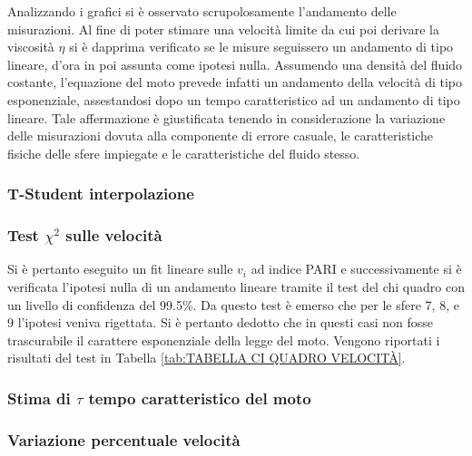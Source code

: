 \documentclass[a4paper,11pt,oneside]{article}
\begin{document}
Analizzando i grafici si è osservato scrupolosamente l'andamento delle misurazioni. Al fine di poter stimare una velocità limite da cui poi derivare la viscosità $\eta$ si è dapprima verificato se le misure seguissero un andamento di tipo lineare, d'ora in poi assunta come ipotesi nulla.
Assumendo una densità del fluido costante, l'equazione del moto prevede infatti un andamento della velocità di tipo esponenziale, assestandosi dopo un tempo caratteristico ad un andamento di tipo lineare. Tale affermazione è giustificata tenendo in considerazione la variazione delle misurazioni dovuta alla componente di errore casuale, le caratteristiche fisiche delle sfere impiegate e le caratteristiche del fluido stesso.\\


\subsubsection*{T-Student interpolazione}

\subsubsection*{Test ${\chi}^{2}$ sulle velocità}
Si è pertanto eseguito un fit lineare sulle $v_{i}$ ad indice PARI e successivamente si è verificata l'ipotesi nulla di un andamento lineare tramite il test del chi quadro con un livello di confidenza del 99.5\%. Da questo test è emerso che per le sfere 7, 8, e 9 l'ipotesi veniva rigettata. Si è pertanto dedotto che in questi casi non fosse trascurabile il carattere esponenziale della legge del moto. Vengono riportati i risultati del test in Tabella \ref{tab:TABELLA CI QUADRO VELOCITÀ}.\\

\subsubsection*{Stima di $\tau$ tempo caratteristico del moto}

\subsubsection*{Variazione percentuale velocità}


\end{document}
